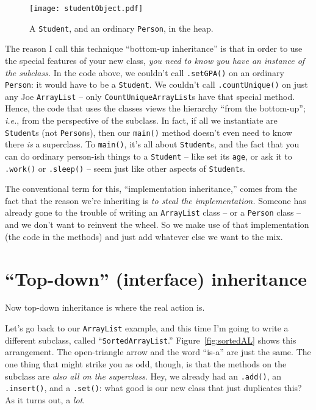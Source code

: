 \begin{figure}
\centering
\texttt{[image: studentObject.pdf]}
\caption{A \texttt{Student}, and an ordinary \texttt{Person}, in the heap.}
\label{fig:studentObject}
\end{figure}

The reason I call this technique ``bottom-up inheritance'' is that in order to
use the special features of your new class, \textit{you need to know you have
an instance of the subclass.} In the code above, we couldn't call
\texttt{.setGPA()} on an ordinary \texttt{Person}: it would have to be a
\texttt{Student}. We couldn't call \texttt{.countUnique()} on just any Joe
\texttt{ArrayList} -- only \texttt{CountUniqueArrayList}s have that special
method. Hence, the code that uses the classes views the hierarchy ``from the
bottom-up''; \textit{i.e.}, from the perspective of the subclass. In fact, if
all we instantiate are \texttt{Student}s (not \texttt{Person}s), then our
\texttt{main()} method doesn't even need to know there \textit{is} a
superclass. To \texttt{main()}, it's all about \texttt{Student}s, and the fact
that you can do ordinary person-ish things to a \texttt{Student} -- like set
its \texttt{age}, or ask it to \texttt{.work()} or \texttt{.sleep()} -- seem
just like other aspects of \texttt{Student}s.

The conventional term for this, ``implementation inheritance,'' comes from the
fact that the reason we're inheriting is \textit{to steal the implementation.}
Someone has already gone to the trouble of writing an \texttt{ArrayList} class
-- or a \texttt{Person} class -- and we don't want to reinvent the wheel. So
we make use of that implementation (the code in the methods) and just add
whatever else we want to the mix.

\section{``Top-down'' (interface) inheritance}

Now top-down inheritance is where the real action is.

Let's go back to our \texttt{ArrayList} example, and this time I'm going to
write a different subclass, called ``\texttt{SortedArrayList}.''
Figure~\ref{fig:sortedAL} shows this arrangement. The open-triangle arrow and
the word ``is-a'' are just the same. The one thing that might strike you as
odd, though, is that the methods on the subclass are \textit{also all on the
superclass}. Hey, we already had an \texttt{.add()}, an \texttt{.insert()},
and a \texttt{.set()}: what good is our new class that just duplicates this?
As it turns out, a \textit{lot}.

